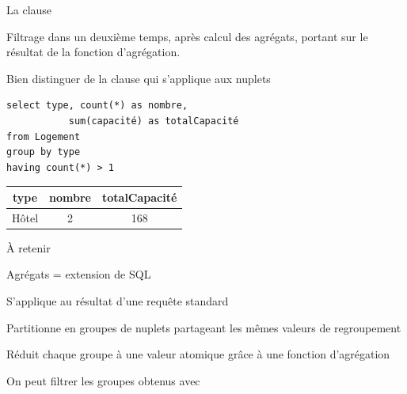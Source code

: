 \begin{frame}[fragile]{La clause }

Filtrage dans un deuxième temps, après calcul des agrégats, 
portant sur le résultat de la fonction d'agrégation.
\vfill

\alert{Bien distinguer de la clause  qui s'applique aux nuplets}

\vfill

\begin{verbatim}
select type, count(*) as nombre, 
           sum(capacité) as totalCapacité
from Logement
group by type
having count(*) > 1
\end{verbatim}

\vfill

\begin{tabular}{c|c|c}
\textbf{type} & \textbf{nombre} & \textbf{totalCapacité}\\ \hline 
Hôtel & 2 & 168\\ \hline 
\end{tabular}

\end{frame}

\begin{frame}{À retenir}

Agrégats = extension de SQL

\vfill

\begin{redbullet}
  \item  S'applique au \alert{résultat} d'une requête standard
  \item \alert{Partitionne} en groupes de nuplets partageant les mêmes valeurs de regroupement
  \item \alert{Réduit} chaque groupe à une valeur atomique grâce à une fonction d'agrégation
  \item On peut \alert{filtrer} les groupes obtenus avec 
\end{redbullet}


\end{frame}
